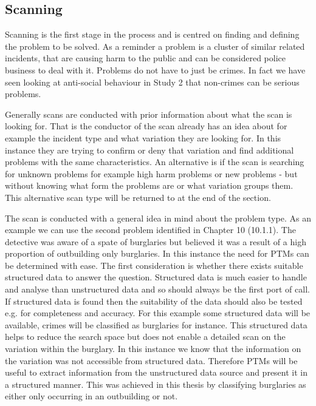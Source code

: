 \subsection{Scanning} Scanning is the first stage in the process and is centred on finding and defining the problem to be solved. As a reminder a problem is a cluster of similar related incidents, that are causing harm to the public and can be considered police business to deal with it. Problems do not have to just be crimes. In fact we have seen looking at anti-social behaviour in Study 2 that non-crimes can be serious problems. 

Generally scans are conducted with prior information about what the scan is looking for. That is the conductor of the scan already has an idea about for example the incident type and what variation they are looking for. In this instance they are trying to confirm or deny that variation and find additional problems with the same characteristics. An alternative is if the scan is searching for unknown problems for example high harm problems or new problems - but without knowing what form the problems are or what variation groups them. This alternative scan type will be returned to at the end of the section.

The scan is conducted with a general idea in mind about the problem type. As an example we can use the second problem identified in Chapter 10 (10.1.1). The detective was aware of a spate of burglaries but believed it was a result of a high proportion of outbuilding only burglaries.  In this instance the need for PTMs can be determined with ease. The first consideration is whether there exists suitable structured data to answer the question. Structured data is much easier to handle and analyse than unstructured data and so should always be the first port of call. If structured data is found then the suitability of the data should also be tested e.g. for completeness and accuracy.  For this example some structured data will be available, crimes will be classified as burglaries for instance. This structured data helps to reduce the search space but does not enable a detailed scan on the variation within the burglary. In this instance we know that the information on the variation was not accessible from structured data. Therefore PTMs will be useful to extract information from the unstructured data source and present it in a structured manner. This was achieved in this thesis by classifying burglaries as either only occurring in an outbuilding or not.  

